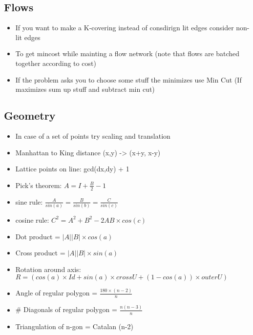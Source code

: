 \subsection{Flows}
\begin{itemize}
\item If you want to make a K-covering instead of consdirign lit edges consider non-lit edges
\item To get mincost while mainting a flow network (note that flows are batched together according to cost)
\item If the problem asks you to choose some stuff the minimizes use Min Cut (If maximizes sum up stuff and subtract min cut)
\end{itemize}
\hrulefill 
\subsection{Geometry}
\begin{itemize}
\item In case of a set of points try scaling and translation
\item Manhattan to King distance (x,y) -> (x+y, x-y)
\item Lattice points on line: gcd(dx,dy) + 1
\item Pick's theorem: $A = I + \frac{B}{2} - 1$
\item sine rule: $\frac{A}{sin(a)} = \frac{B}{sin(b)} = \frac{C}{sin(c)}$
\item cosine rule: $C^2=A^2+B^2-2AB \times cos(c)$
\item Dot product = $|A| |B| \times cos(a)$
\item Cross product = $|A| |B| \times sin(a)$
\item Rotation around axis: $R = (cos(a) \times Id + sin(a) \times cross U + (1 - cos(a)) \times outer U)$
\item Angle of regular polygon = $\frac{180 \times (n-2)}{n}$
\item \# Diagonals of regular polygon = $\frac{n (n-3)}{n}$
\item Triangulation of n-gon = Catalan (n-2)
\end{itemize}
\hrulefill
